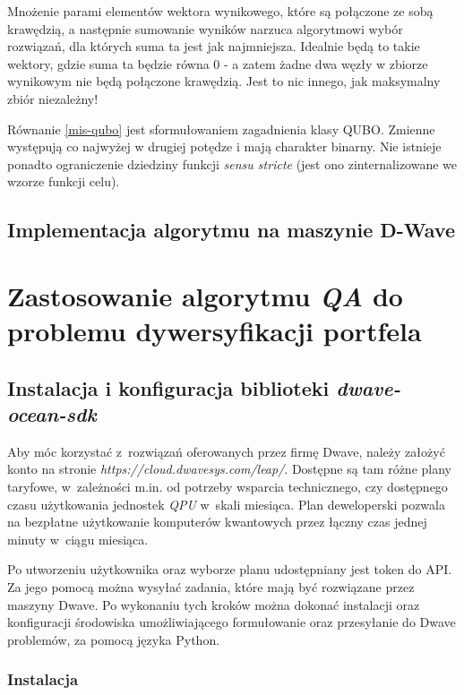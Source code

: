 \documentclass[12pt,a4paper,twoside,openany]{book}
\begin{document}
Mnożenie parami elementów wektora wynikowego, które są połączone ze sobą krawędzią, a następnie sumowanie wyników narzuca algorytmowi wybór rozwiązań, dla których suma ta jest jak najmniejsza.
Idealnie będą to takie wektory, gdzie suma ta będzie równa 0 - a zatem żadne dwa węzły w zbiorze wynikowym nie będą połączone krawędzią.
Jest to nic innego, jak maksymalny zbiór niezależny!

Równanie \ref{mis-qubo} jest sformułowaniem zagadnienia klasy QUBO.
Zmienne występują co najwyżej w drugiej potędze i mają charakter binarny.
Nie istnieje ponadto ograniczenie dziedziny funkcji \textit{sensu stricte} (jest ono zinternalizowane we wzorze funkcji celu).


\section{Implementacja algorytmu na maszynie D-Wave}



\chapter{Zastosowanie algorytmu \textit{QA} do problemu dywersyfikacji portfela}
\label{sec:QA_prac}

\section{Instalacja i konfiguracja biblioteki \textit{dwave-ocean-sdk}}

Aby móc korzystać z~rozwiązań oferowanych przez firmę Dwave, należy założyć konto na stronie \textit{https://cloud.dwavesys.com/leap/}.
Dostępne są tam różne plany taryfowe, w~zależności m.in. od potrzeby wsparcia technicznego, czy dostępnego czasu użytkowania jednostek \textit{QPU} w~skali miesiąca.
Plan deweloperski pozwala na bezpłatne użytkowanie komputerów kwantowych przez łączny czas jednej minuty w~ciągu miesiąca.

Po utworzeniu użytkownika oraz wyborze planu udostępniany jest token do API.
Za jego pomocą można wysyłać zadania, które mają być rozwiązane przez maszyny Dwave.
Po wykonaniu tych kroków można dokonać instalacji oraz konfiguracji środowiska umożliwiającego formułowanie oraz przesyłanie do Dwave problemów, za pomocą języka Python.

\subsection{Instalacja}
\end{document}
